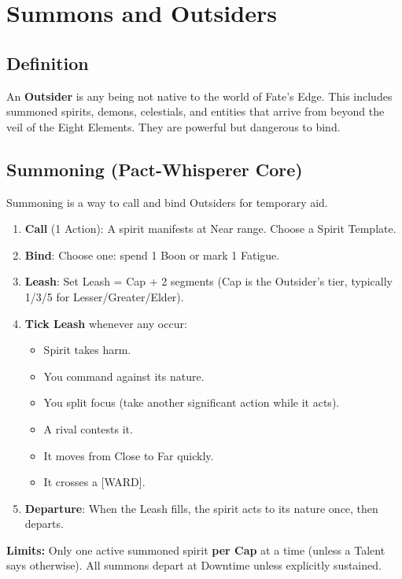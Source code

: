 
\section{Summons and Outsiders}

\subsection{Definition}
An \textbf{Outsider} is any being not native to the world of Fate’s Edge. This includes summoned spirits, demons, celestials, and entities that arrive from beyond the veil of the Eight Elements. They are powerful but dangerous to bind.

\subsection{Summoning (Pact-Whisperer Core)}
Summoning is a way to call and bind Outsiders for temporary aid.

\begin{enumerate}
  \item \textbf{Call} (1 Action): A spirit manifests at Near range. Choose a Spirit Template.
  \item \textbf{Bind}: Choose one: spend 1 Boon or mark 1 Fatigue.
  \item \textbf{Leash}: Set Leash = Cap + 2 segments (Cap is the Outsider's tier, typically 1/3/5 for Lesser/Greater/Elder).
  \item \textbf{Tick Leash} whenever any occur:
    \begin{itemize}
      \item Spirit takes harm.
      \item You command against its nature.
      \item You split focus (take another significant action while it acts).
      \item A rival contests it.
      \item It moves from Close to Far quickly.
      \item It crosses a [WARD].
    \end{itemize}
  \item \textbf{Departure}: When the Leash fills, the spirit acts to its nature once, then departs.
\end{enumerate}

\textbf{Limits:} Only one active summoned spirit \textbf{per Cap} at a time (unless a Talent says otherwise). All summons depart at Downtime unless explicitly sustained.

